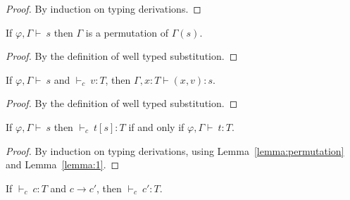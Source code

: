 \documentclass[preprint,authoryear,sort&compress,9pt,nocopyrightspace]{article}
\newcommand{\tto}{\longrightarrow}
\newcommand{\SubxD}{(x,v):s}
\newcommand{\env}{{\emt,\Gamma \vdash \ }}
\newcommand{\tyC}{{\vdash_c \ }}
\newcommand{\emt}{\varphi}
\begin{document}
\begin{proof}By induction on typing derivations.
\end{proof}

\begin{lemma}
\label{lemma:1}
\mbox{}
If $\env s$ then $\Gamma$ is a permutation of $\Gamma(s)$.
\end{lemma}

\begin{proof}By the definition of well typed substitution.
\end{proof}
\begin{lemma}
\label{lemma:2}
\mbox{}
If $\env s$ and $\tyC v : T$, then $\Gamma,x:T \vdash \SubxD$.
\end{lemma}

\begin{proof} By the definition of well typed substitution.\end{proof}

\begin{lemma}
\label{lemma:3}
\mbox{}
If $\env s$ then $\tyC t[s] : T$ if and only if $\env t:T$.
\end{lemma}

\begin{proof}By induction on typing derivations, using Lemma~\ref{lemma:permutation} and Lemma~\ref{lemma:1}.
\end{proof}


\begin{theorem}[Preservation]
\label{theorem:preservation}
\mbox{}
If $\tyC c : T$ and $c \tto c'$, then $\tyC c	' : T$.
\end{theorem}
\end{document}
